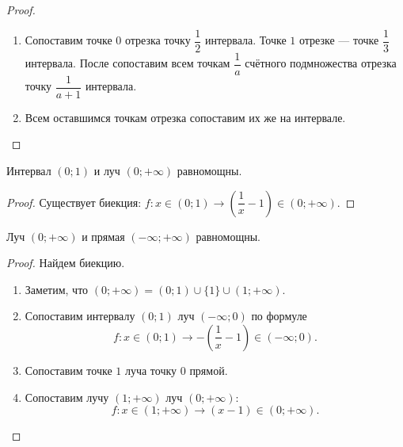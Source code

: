 \documentclass[a4paper]{article}
\theoremstyle{named}
\begin{document}
\begin{colloq}
\begin{proof}
\begin{enumerate}
                \item
                    Сопоставим точке $0$ отрезка точку $\dfrac{1}{2}$ интервала. Точке $1$ отрезке --- точке $\dfrac{1}{3}$ интервала. После сопоставим всем точкам $\dfrac{1}{a}$ счётного подмножества отрезка точку $\dfrac{1}{a + 1}$ интервала.

                \item
                    Всем оставшимся точкам отрезка сопоставим их же на интервале.
            \end{enumerate}
        \end{proof}

        \begin{theorem*}
            Интервал $(0; 1)$ и луч $(0; +\infty)$ равномощны.
        \end{theorem*}

        \begin{proof}
            Существует биекция: $f: x \in (0; 1) \to \left(\dfrac{1}{x} - 1\right) \in (0; +\infty)$.
        \end{proof}

        \begin{theorem*}
            Луч $(0; +\infty)$ и прямая $(-\infty; +\infty)$ равномощны.
        \end{theorem*}

        \begin{proof}
            Найдем биекцию.
            \begin{enumerate}
            \item
                Заметим, что $(0; +\infty) = (0; 1) \cup \{1\} \cup (1; +\infty)$.

            \item
                Сопоставим интервалу $(0; 1)$ луч $(-\infty; 0)$ по формуле
                \begin{equation*}
                    f: x \in (0; 1) \to -\left(\dfrac{1}{x} - 1\right) \in (-\infty; 0).
                \end{equation*}

            \item
                Сопоставим точке $1$ луча точку $0$ прямой.

            \item
                Сопоставим лучу $(1; +\infty)$ луч $(0; +\infty)$:
                \begin{equation*}
                    f: x \in (1; +\infty) \to (x - 1) \in (0; +\infty).
                \end{equation*}
            \end{enumerate}
        \end{proof}


\end{colloq}
\end{document}
